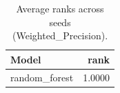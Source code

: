 \begin{table}[t]
\centering
\begin{tabular}{lr}
\toprule
Model & rank \\
\midrule
random_forest & 1.0000 \\
\bottomrule
\end{tabular}
\caption{Average ranks across seeds (Weighted_Precision).}
\label{tab:avg_rank_Weighted_Precision}
\end{table}
